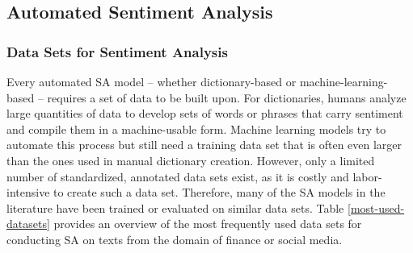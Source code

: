 \subsection{Automated Sentiment Analysis}


\subsubsection{Data Sets for Sentiment Analysis}

Every automated SA model -- whether dictionary-based or machine-learning-based -- requires a set of data to be built upon. For dictionaries, humans analyze large quantities of data to develop sets of words or phrases that carry sentiment and compile them in a machine-usable form. Machine learning models try to automate this process but still need a training data set that is often even larger than the ones used in manual dictionary creation. However, only a limited number of standardized, annotated data sets exist, as it is costly and labor-intensive to create such a data set. Therefore, many of the SA models in the literature have been trained or evaluated on similar data sets. Table \ref{most-used-datasets} provides an overview of the most frequently used data sets for conducting SA on texts from the domain of finance or social media.



